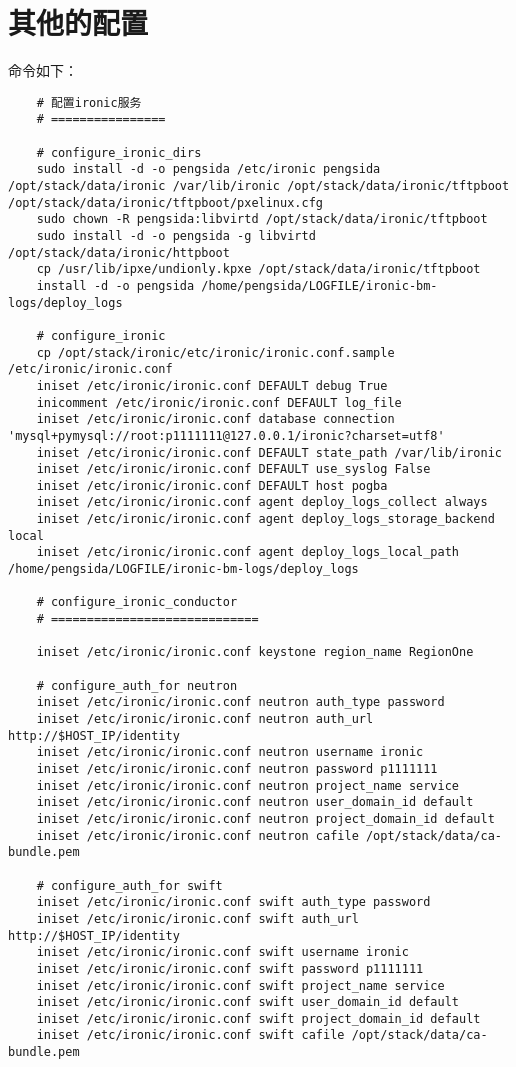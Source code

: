 \documentclass[a4paper,left=1.5cm,right=1.5cm,11pt]{article}
\begin{document}
\section{其他的配置}
	命令如下：
	\begin{lstlisting}
	# 配置ironic服务
	# ================

	# configure_ironic_dirs
	sudo install -d -o pengsida /etc/ironic pengsida /opt/stack/data/ironic /var/lib/ironic /opt/stack/data/ironic/tftpboot /opt/stack/data/ironic/tftpboot/pxelinux.cfg
	sudo chown -R pengsida:libvirtd /opt/stack/data/ironic/tftpboot
	sudo install -d -o pengsida -g libvirtd /opt/stack/data/ironic/httpboot
	cp /usr/lib/ipxe/undionly.kpxe /opt/stack/data/ironic/tftpboot
	install -d -o pengsida /home/pengsida/LOGFILE/ironic-bm-logs/deploy_logs

	# configure_ironic
	cp /opt/stack/ironic/etc/ironic/ironic.conf.sample /etc/ironic/ironic.conf
	iniset /etc/ironic/ironic.conf DEFAULT debug True
	inicomment /etc/ironic/ironic.conf DEFAULT log_file
	iniset /etc/ironic/ironic.conf database connection 'mysql+pymysql://root:p1111111@127.0.0.1/ironic?charset=utf8'
	iniset /etc/ironic/ironic.conf DEFAULT state_path /var/lib/ironic
	iniset /etc/ironic/ironic.conf DEFAULT use_syslog False
	iniset /etc/ironic/ironic.conf DEFAULT host pogba
	iniset /etc/ironic/ironic.conf agent deploy_logs_collect always
	iniset /etc/ironic/ironic.conf agent deploy_logs_storage_backend local
	iniset /etc/ironic/ironic.conf agent deploy_logs_local_path /home/pengsida/LOGFILE/ironic-bm-logs/deploy_logs

	# configure_ironic_conductor
	# =============================

	iniset /etc/ironic/ironic.conf keystone region_name RegionOne

	# configure_auth_for neutron
	iniset /etc/ironic/ironic.conf neutron auth_type password
	iniset /etc/ironic/ironic.conf neutron auth_url http://$HOST_IP/identity
	iniset /etc/ironic/ironic.conf neutron username ironic
	iniset /etc/ironic/ironic.conf neutron password p1111111
	iniset /etc/ironic/ironic.conf neutron project_name service
	iniset /etc/ironic/ironic.conf neutron user_domain_id default
	iniset /etc/ironic/ironic.conf neutron project_domain_id default
	iniset /etc/ironic/ironic.conf neutron cafile /opt/stack/data/ca-bundle.pem

	# configure_auth_for swift
	iniset /etc/ironic/ironic.conf swift auth_type password
	iniset /etc/ironic/ironic.conf swift auth_url http://$HOST_IP/identity
	iniset /etc/ironic/ironic.conf swift username ironic
	iniset /etc/ironic/ironic.conf swift password p1111111
	iniset /etc/ironic/ironic.conf swift project_name service
	iniset /etc/ironic/ironic.conf swift user_domain_id default
	iniset /etc/ironic/ironic.conf swift project_domain_id default
	iniset /etc/ironic/ironic.conf swift cafile /opt/stack/data/ca-bundle.pem


\end{lstlisting}
\end{document}
